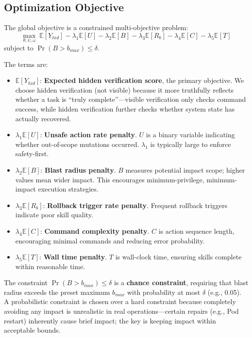 \documentclass[conference,10pt]{IEEEtran}
\begin{document}
\subsection{Optimization Objective}

The global objective is a constrained multi-objective problem:
\begin{equation}
\max_{\theta,\psi,\omega} \; \mathbb{E}[Y_{hid}] - \lambda_1 \mathbb{E}[U] - \lambda_2 \mathbb{E}[B] - \lambda_3 \mathbb{E}[R_b] - \lambda_4 \mathbb{E}[C] - \lambda_5 \mathbb{E}[T]
\end{equation}
subject to $\Pr(B > b_{max}) \le \delta$.

The terms are:
\begin{itemize}
  \item $\mathbb{E}[Y_{hid}]$: \textbf{Expected hidden verification score}, the primary objective.  We choose hidden verification (not visible) because it more truthfully reflects whether a task is ``truly complete''---visible verification only checks command success, while hidden verification further checks whether system state has actually recovered.
  \item $\lambda_1 \mathbb{E}[U]$: \textbf{Unsafe action rate penalty}.  $U$ is a binary variable indicating whether out-of-scope mutations occurred.  $\lambda_1$ is typically large to enforce safety-first.
  \item $\lambda_2 \mathbb{E}[B]$: \textbf{Blast radius penalty}.  $B$ measures potential impact scope; higher values mean wider impact.  This encourages minimum-privilege, minimum-impact execution strategies.
  \item $\lambda_3 \mathbb{E}[R_b]$: \textbf{Rollback trigger rate penalty}.  Frequent rollback triggers indicate poor skill quality.
  \item $\lambda_4 \mathbb{E}[C]$: \textbf{Command complexity penalty}.  $C$ is action sequence length, encouraging minimal commands and reducing error probability.
  \item $\lambda_5 \mathbb{E}[T]$: \textbf{Wall time penalty}.  $T$ is wall-clock time, ensuring skills complete within reasonable time.
\end{itemize}
The constraint $\Pr(B > b_{max}) \le \delta$ is a \textbf{chance constraint}, requiring that blast radius exceeds the preset maximum $b_{max}$ with probability at most $\delta$ (e.g., 0.05).
A probabilistic constraint is chosen over a hard constraint because completely avoiding any impact is unrealistic in real operations---certain repairs (e.g., Pod restart) inherently cause brief impact; the key is keeping impact within acceptable bounds.
\end{document}
